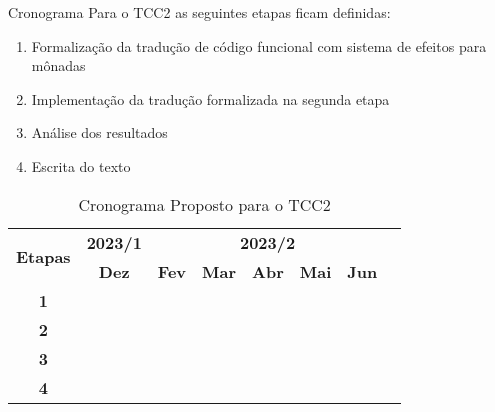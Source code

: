 \begin{frame}{Cronograma}
    Para o TCC2 as seguintes etapas ficam definidas:
    \begin{enumerate}
        \item Formalização da tradução de código funcional com sistema de efeitos para mônadas
        \item Implementação da tradução formalizada na segunda etapa
        \item Análise dos resultados
        \item Escrita do texto
    \end{enumerate}
    \begin{table}[htp]
        \centering
        \noindent \begin{tabular}{|c|c|c|c|c|c|c|c|}
            \hline
            \multirow{2}{*}{\textbf{\small{Etapas}}} & \multicolumn{1}{|c|}{\textbf{\small{2023/1}}} &
            \multicolumn{5}{|c|}{\textbf{\small{2023/2}}} \\
            \cline{2-7}
            &\textbf{Dez} & \textbf{Fev} & \textbf{Mar} & \textbf{Abr} & \textbf{Mai} & \textbf{Jun} \\
            \hline
            \textbf{\small{1}}  & \cellcolor{gray} & \cellcolor{gray} & \cellcolor{gray} & & & \\
            \hline
            \textbf{\small{2}}  & & \cellcolor{gray} & \cellcolor{gray} & \cellcolor{gray} & & \\
            \hline
            \textbf{\small{3}}  & & & \cellcolor{gray} & \cellcolor{gray} & \cellcolor{gray} & \\
            \hline
            \textbf{\small{4}}  & & & \cellcolor{gray} & \cellcolor{gray} & \cellcolor{gray} & \cellcolor{gray}\\
            \hline
            \end{tabular}
        \caption[Cronograma Proposto para o TCC2]{Cronograma Proposto para o TCC2}
        \label{tab:cronograma}
    \end{table}
\end{frame}
